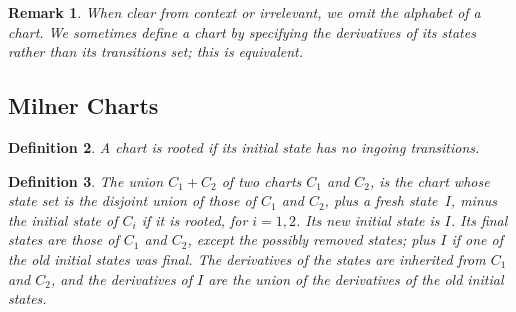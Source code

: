 \documentclass{article}
\newtheorem{definition}{Definition}[section]
\newtheorem{remark}[definition]{Remark}
\begin{document}
\begin{remark}
When clear from context or irrelevant, we omit the alphabet of a chart.
We sometimes define a chart by specifying the derivatives of its states rather than its 
transitions set; this is equivalent.
\end{remark}

\subsection{Milner Charts}

\begin{definition} A chart is \emph{rooted} if its initial state has no ingoing transitions.
\end{definition}




\begin{definition}
The union $C_1 + C_2$  of two charts $C_1$ and $C_2$, is the chart whose state set is the disjoint union of those of $C_1$ and $C_2$, plus 
a fresh state~$I$, minus the initial state of $C_i$ if it is rooted, for $i=1,2$. 
Its new initial state is $I$. 
Its final states are those of $C_1$ and $C_2$, 
except the possibly removed states; plus
 $I$ if one of the old initial states was final. 
 The derivatives of the states are inherited from $C_1$ and $C_2$, and the derivatives of 
 $I$ are the union of the derivatives of the old initial states. 
\end{definition}
\end{document}
